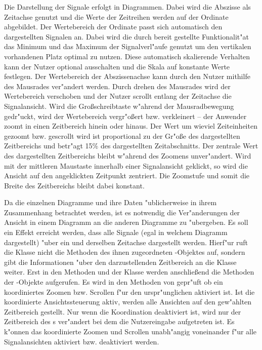 Die Darstellung der Signale erfolgt in Diagrammen.
Dabei wird die Abszisse als Zeitachse genutzt und die Werte der Zeitreihen werden auf der Ordinate abgebildet.
Der Wertebereich der Ordinate passt sich automatisch den dargestellten Signalen an.
Dabei wird die durch \jfc bereit gestellte Funktionalit"at das Minimum und das Maximum der Signalverl"aufe genutzt um den vertikalen vorhandenen Platz optimal zu nutzen.
Diese automatisch skalierende Verhalten kann der Nutzer optional ausschalten und die Skala auf konstante Werte festlegen.
Der Wertebereich der Abszissenachse kann durch den Nutzer mithilfe des Mausrades ver"andert werden.
Durch drehen des Mausrades wird der Wertebereich verschoben und der Nutzer scrollt entlang der Zeitachse die Signalansicht.
Wird die Gro{\ss}schreibtaste w"ahrend der Mausradbewegung gedr"uckt, wird der Wertebereich vergr"o{\ss}ert bzw. verkleinert -- der Anwender zoomt in einen Zeitbereich hinein oder hinaus.
Der Wert um wieviel Zeiteinheiten gezoomt bzw. gescrollt wird ist proportional zu der Gr"o{\ss}e des dargestellten Zeitbereichs und betr"agt \unit{15}{\%} des dargestellten Zeitabschnitts.
Der zentrale Wert des dargestellten Zeitbereichs bleibt w"ahrend des Zoomens unver"andert.
Wird mit der mittleren Maustaste innerhalb einer Signalansicht geklickt, so wird die Ansicht auf den angeklickten Zeitpunkt zentriert.
Die Zoomstufe und somit die Breite des Zeitbereichs bleibt dabei konstant.

Da die einzelnen Diagramme und ihre Daten "ublicherweise in ihrem Zusammenhang betrachtet werden, ist es notwendig die Ver"anderungen der Ansicht in einem Diagramm an die anderen Diagramme zu "ubergeben.
Es soll ein Effekt erreicht werden, dass alle Signale (egal in welchem Diagramm dargestellt) "uber ein und derselben Zeitachse dargestellt werden.
Hierf"ur ruft die Klasse  nicht die Methoden des ihnen zugeordneten -Objektes auf, sondern gibt die Informationen "uber den darzustellenden Zeitbereich an die Klasse  weiter.
Erst in den Methoden  und  der Klasse  werden anschlie{\ss}end die Methoden der -Objekte aufgerufen.
Es wird in den Methoden von  gepr"uft ob ein koordiniertes Zoomen bzw. Scrollen f"ur den urspr"unglichen  aktiviert ist.
Ist die koordinierte Ansichtssteuerung aktiv, werden alle Ansichten auf den gew"ahlten Zeitbereich gestellt.
Nur wenn die Koordination deaktiviert ist, wird nur der Zeitbereich des s ver"andert bei dem die Nutzereingabe aufgetreten ist.
Es k"onnen das koordinierte Zoomen und Scrollen unabh"angig voneinander f"ur alle Signalansichten aktiviert bzw. deaktiviert werden.

